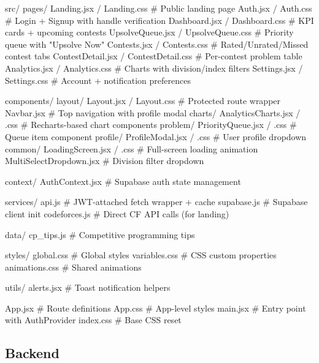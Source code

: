 \documentclass[11pt, a4paper]{article}
\begin{document}
\begin{codebox}
src/
  pages/
    Landing.jsx / Landing.css           # Public landing page
    Auth.jsx / Auth.css                 # Login + Signup with handle verification
    Dashboard.jsx / Dashboard.css       # KPI cards + upcoming contests
    UpsolveQueue.jsx / UpsolveQueue.css # Priority queue with "Upsolve Now"
    Contests.jsx / Contests.css         # Rated/Unrated/Missed contest tabs
    ContestDetail.jsx / ContestDetail.css # Per-contest problem table
    Analytics.jsx / Analytics.css       # Charts with division/index filters
    Settings.jsx / Settings.css         # Account + notification preferences

  components/
    layout/
      Layout.jsx / Layout.css           # Protected route wrapper
      Navbar.jsx                        # Top navigation with profile modal
    charts/
      AnalyticsCharts.jsx / .css        # Recharts-based chart components
    problem/
      PriorityQueue.jsx / .css          # Queue item component
    profile/
      ProfileModal.jsx / .css           # User profile dropdown
    common/
      LoadingScreen.jsx / .css          # Full-screen loading animation
      MultiSelectDropdown.jsx           # Division filter dropdown

  context/
    AuthContext.jsx                     # Supabase auth state management

  services/
    api.js                             # JWT-attached fetch wrapper + cache
    supabase.js                        # Supabase client init
    codeforces.js                      # Direct CF API calls (for landing)

  data/
    cp_tips.js                         # Competitive programming tips

  styles/
    global.css                         # Global styles
    variables.css                      # CSS custom properties
    animations.css                     # Shared animations

  utils/
    alerts.jsx                         # Toast notification helpers

  App.jsx                             # Route definitions
  App.css                             # App-level styles
  main.jsx                            # Entry point with AuthProvider
  index.css                           # Base CSS reset
\end{codebox}

\subsection{Backend}
\end{document}

